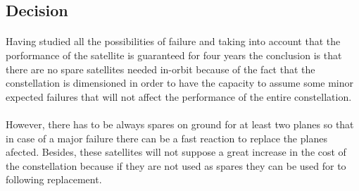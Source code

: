 \subsection{Decision}
\paragraph{}Having studied all the possibilities of failure and taking into account that the porformance of the satellite is guaranteed for four years the conclusion is that there are no spare satellites needed in-orbit because of the fact that the constellation is dimensioned in order to have the capacity to assume some minor expected failures that will not affect the performance of the entire constellation.

\paragraph{}However, there has to be always spares on ground for at least two planes so that in case of a major failure there can be a fast reaction to replace the planes afected. Besides, these satellites will not suppose a great increase in the cost of the constellation because if they are not used as spares they can be used for to following replacement. 


 